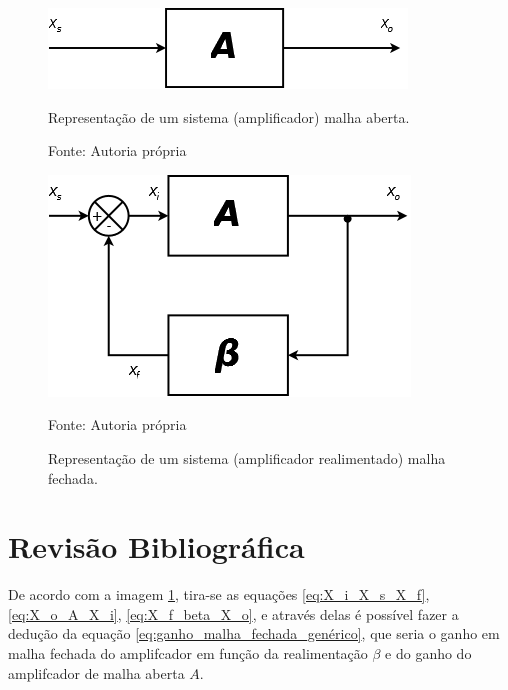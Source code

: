 \documentclass[openright]{normas-utf-tex} %
\begin{document}
\begin{figure}[H]
\centering
\begin{minipage}{0.45\textwidth}
\centering
\includegraphics[width=1.0\linewidth]{img/BlocosMalhaAberta.png}
\caption{Representação de um sistema (amplificador) malha aberta.}
Fonte: Autoria própria
\label{fig:blocos_malha_aberta}
\end{minipage}\hfill
\begin{minipage}{0.45\textwidth}
\centering
\includegraphics[width=1.0\linewidth]{img/BlocosMalhaFechada.png}
\caption{Representação de um sistema (amplificador realimentado) malha fechada.}
Fonte: Autoria própria
\label{fig:blocos_malha_fechada}
\end{minipage}
\end{figure}

\section{Revisão Bibliográfica}
\label{rev_bib}

De acordo com a imagem \ref{fig:blocos_malha_fechada}, tira-se as equações \ref{eq:X_i_X_s_X_f}, \ref{eq:X_o_A_X_i}, \ref{eq:X_f_beta_X_o}, e através delas é possível fazer a dedução da equação \ref{eq:ganho_malha_fechada_genérico}, que seria o ganho em malha fechada do amplifcador em função da realimentação $\beta$ e do ganho do amplifcador de malha aberta $A$.\cite{pedroni,millman} 
\end{document}
